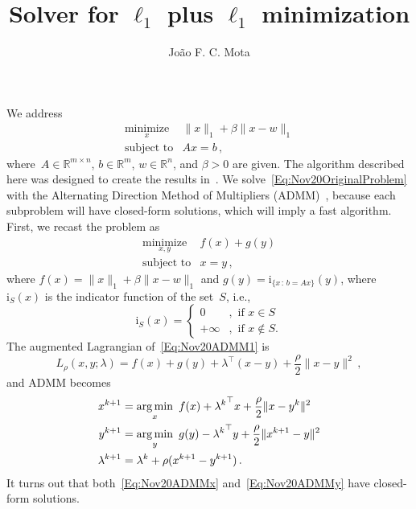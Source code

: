 \documentclass[letter,10pt]{article}
\title{Solver for $\ell_1$ plus $\ell_1$ minimization}
\author{Jo\~ao F. C. Mota}
\theoremstyle{definition}
\theoremstyle{nonumberplain}
\begin{document}
\maketitle

	We address
	\begin{equation}\label{Eq:Nov20OriginalProblem}
		\begin{array}{ll}
			\underset{x}{\text{minimize}} & \|x\|_1 + \beta \|x - w\|_1 \\
			\text{subject to} & Ax = b\,,
		\end{array}
	\end{equation}
	where~$A \in \mathbb{R}^{m \times n}$, $b \in \mathbb{R}^m$, $w \in \mathbb{R}^n$, and $\beta > 0$ are given. The algorithm described here was designed to create the results in~\cite{Mota14-CompressedSensingPriorInfo}. We solve~\eqref{Eq:Nov20OriginalProblem} with the Alternating Direction Method of Multipliers (ADMM)~\cite{Glowinski75-ADMM,Gabay76-ADMM,Boyd11-ADMM}, because each subproblem will have closed-form solutions, which will imply a fast algorithm. First, we recast the problem as
	\begin{equation}\label{Eq:Nov20ADMM1}
		\begin{array}{ll}
			\underset{x,y}{\text{minimize}} & f(x) + g(y) \\
			\text{subject to} & x = y\,,
		\end{array}
	\end{equation}
	where $f(x) = \|x\|_1 + \beta \|x - w\|_1$ and $g(y) = \text{i}_{\{x\,:\, b = Ax\}}(y)$, where $\text{i}_S(x)$ is the indicator function of the set~$S$, i.e.,
	$$
		\text{i}_S(x) = \left\{
											\begin{array}{ll}
												0 &,\,\,\text{if $x \in S$} \\
												+\infty &,\,\, \text{if $x \not\in S$}.
											\end{array}
										\right.
	$$
	The augmented Lagrangian of~\eqref{Eq:Nov20ADMM1} is
	$$
		L_\rho (x,y;\lambda) = f(x) + g(y) + \lambda^\top (x - y) + \frac{\rho}{2} \|x - y\|^2\,,
	$$
	and ADMM becomes
	\begin{align}
		x^{k+1} &= \underset{x}{\arg\min}\,\,\, f(x) + {\lambda^k}^\top x +\frac{\rho}{2}\|x - y^k\|^2
		\label{Eq:Nov20ADMMx}
		\\
		y^{k+1} &= \underset{y}{\arg\min}\,\,\, g(y) - {\lambda^k}^\top y +\frac{\rho}{2}\|x^{k+1} - y\|^2
		\label{Eq:Nov20ADMMy}
		\\
		\lambda^{k+1} &= \lambda^k + \rho (x^{k+1} - y^{k+1})\,.
		\notag
	\end{align}
	It turns out that both~\eqref{Eq:Nov20ADMMx} and~\eqref{Eq:Nov20ADMMy} have closed-form solutions.
\end{document}
